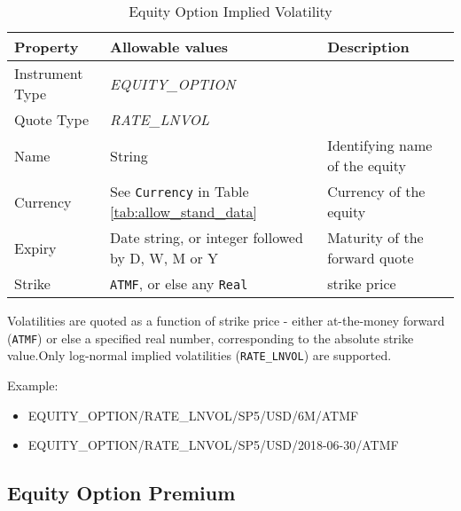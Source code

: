 \begin{table}[H]
	\centering
	\begin{tabular}{|p{3cm}|p{3.5cm}|p{7cm}|}
		\hline
		{\bf Property} & {\bf Allowable values} & {\bf Description} \\ \hline
        Instrument Type & \emph{EQUITY\_OPTION} & \\ \hline
        Quote Type & \emph{RATE\_LNVOL} & \\ \hline
        Name & String & Identifying name of the equity \\ \hline
        Currency & See \lstinline!Currency! in Table \ref{tab:allow_stand_data}&  Currency of the equity \\ \hline
        Expiry & Date string, or integer followed by D, W, M or Y & Maturity of the forward quote \\ \hline
        Strike & {\tt ATMF}, or else any {\tt Real} & strike price \\ \hline
	\end{tabular}
	\caption{Equity Option Implied Volatility}
	\label{tab:eqimplvol_quote}
\end{table}

Volatilities are quoted as a function of strike price - either at-the-money forward ({\tt ATMF}) or else a specified 
real number, corresponding to the absolute strike value.Only log-normal implied volatilities ({\tt RATE\_LNVOL}) are 
supported.

\medskip
Example:
\begin{itemize}
	\item {EQUITY\_OPTION/RATE\_LNVOL/SP5/USD/6M/ATMF}
	\item {EQUITY\_OPTION/RATE\_LNVOL/SP5/USD/2018-06-30/ATMF}
\end{itemize}

\subsection{Equity Option Premium}
\label{md:equity_option_premium}

